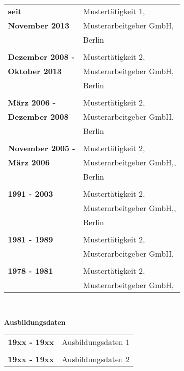 \documentclass{article}
\begin{document}
\begin{minipage}[t]{0.4\textwidth}
\begin{tabular}{p{4cm}l}
\textbf{seit}								 & Mustertätigkeit 1,  \\
\textbf{November 2013}						 & Musterarbeitgeber GmbH,\\
  											 & Berlin  \\
  											 & \\
\textbf{Dezember 2008 -}					 & Mustertätigkeit 2,  \\
\textbf{Oktober 2013}						 & Musterarbeitgeber GmbH,\\
  											 & Berlin  \\
  											 & \\
\textbf{März 2006 -}						 & Mustertätigkeit 2,  \\
\textbf{Dezember 2008}						 & Musterarbeitgeber GmbH,  \\
  											 & Berlin  \\
  											 & \\
\textbf{November 2005 -}					 & Mustertätigkeit 2,  \\
\textbf{März 2006}							 & Musterarbeitgeber GmbH,,  \\
  											 & Berlin  \\  	
  											 & \\									  
\textbf{1991 - 2003}						 & Mustertätigkeit 2,  \\
  											 & Musterarbeitgeber GmbH,, \\
  											 & Berlin  \\	 
  											 & \\
\textbf{1981 - 1989}						 & Mustertätigkeit 2,  \\
  											 & Musterarbeitgeber GmbH, \\
  											 & \\
\textbf{1978 - 1981}						 & Mustertätigkeit 2,  \\
  											 & Musterarbeitgeber GmbH, \\
  											 
\end{tabular}\\
\vspace{1 cm}

{\Large \textbf{Ausbildungsdaten}}\\

\begin{tabular}{p{4cm}l}

\textbf{19xx - 19xx}						 & Ausbildungsdaten 1  \\
											 & \\
\textbf{19xx - 19xx}						 & Ausbildungsdaten 2 \\
					 
\end{tabular}
\end{minipage}\hspace{2.5 cm}
\end{document}
